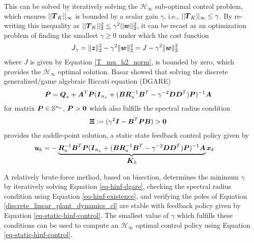 This can be solved by iteratively solving the $\mathcal{H}_{\infty}$ sub-optimal control problem, which ensures $||\vb*{T}_{K}||_{\infty}$ is bounded by a scalar gain $\gamma$, i.e., $||\vb*{T}_{K}||_{\infty} \leq \gamma$.  By re-writing this inequality as $||\vb*{T}_{K}||_{2}^{2} \leq \gamma^{2}  ||\vb*{w}||_{2}^{2}$, it can be recast as an optimization problem of finding the smallest $\gamma \geq 0$ under which the cost function
\begin{equation}
\begin{aligned}
	J_{\gamma} &= \lVert \vb*{z} \rVert_{2}^{2} - \gamma^{2} \lVert \vb*{w} \rVert_{2}^{2}
	= J - \gamma^{2} \lVert \vb*{w} \rVert_{2}^{2} \label{eq-lq-cost-infinite-w}
\end{aligned}
\end{equation}
where $J$ is given by Equation \eqref{T_mu_h2_norm}, is bounded by zero, which provides the $\mathcal{H}_{\infty}$ optimal solution.  Basar \cite{bacsar2008h} showed that solving the discrete generalized/game algebraic Riccati equation (DGARE)
\begin{equation}
\begin{aligned}
	\vb*{P} &= \vb*{Q}_{x} + \vb*{A}^{T}\vb*{P}(\vb*{I}_{n_{x}}
		+ (\vb*{B}\vb*{R}_{u}^{-1}\vb*{B}^{T} - \gamma^{-2}\vb*{D}\vb*{D}^{T})\vb*{P})^{-1}\vb*{A}\\
\end{aligned} \label{eq-hinf-dgare}
\end{equation}
for matrix $\vb*{P} \in \mathbb{S}^{n_{x}}$, $\vb*{P} > \vb*{0}$ which also fulfills the spectral radius condition 
\begin{equation}
\begin{aligned}
	\vb*{\Xi} := (\gamma^{2}\vb*{I} - \vb*{B}^{T}\vb*{P}\vb*{B}) > \vb*{0}
\end{aligned} \label{eq-hinf-existence}
\end{equation}
provides the saddle-point solution, a static state feedback control policy given by
\begin{equation}
\begin{aligned}
	\vb*{u}_{k} &= -\underbrace{
	\vb*{R}_{u}^{-1}\vb*{B}^{T}\vb*{P}(\vb*{I}_{n_{x}}
		+ (\vb*{B}\vb*{R}_{u}^{-1}\vb*{B}^{T} - \gamma^{-2}\vb*{D}\vb*{D}^{T})\vb*{P})^{-1}\vb*{A}
	}_{\text{\normalsize $\vb*{K}_{b}$}}
	\vb*{x}_{k}
\end{aligned} \label{eq-static-hinf-control}
\end{equation}

A relatively brute-force method, based on bisection, determines the minimum $\gamma$ by iteratively solving Equation \eqref{eq-hinf-dgare}, checking the spectral radius condition using Equation \eqref{eq-hinf-existence}, and verifying the poles of Equation \eqref{discrete_linear_plant_dynamics_cl} are stable with feedback policy given by Equation \eqref{eq-static-hinf-control}.  The smallest value of $\gamma$ which fulfills these conditions can be used to compute an $\mathcal{H}_{\infty}$ optimal control policy using Equation \eqref{eq-static-hinf-control}.

